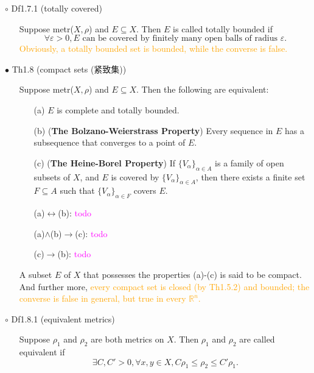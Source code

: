 \documentclass{article}
\begin{document}
{\Large $\circ $ Df1.7.1 (totally covered)}\par
\begin{itemize}
    \item[]
    {\large Suppose metr($X, \rho$) and $E\subseteq X$. Then $E$ is called totally bounded if
    $$\forall\varepsilon>0, E \text{ can be covered by finitely many open balls of radius }\varepsilon. $$}
    {\textcolor{orange}{Obviously, a totally bounded set is bounded, while the converse is false.}}
\end{itemize}\par
\quad

{\Large $\bullet $ Th1.8 (compact sets (紧致集))}\par
\begin{itemize}
    \item[]
    {\large Suppose metr($X, \rho$) and $E\subseteq X$. Then the following are equivalent:
    \begin{enumerate}
        \item[(a)] $E$ is complete and totally bounded.
        \item[(b)] (\textbf{The Bolzano-Weierstrass Property}) Every sequence in $E$ has a subsequence 
        that converges to a point of $E$.
        \item[(c)] (\textbf{The Heine-Borel Property}) If $\{V_\alpha\}_{\alpha \in A}$ is a family of open subsets
        of $X$, and $E$ is covered by $\{V_\alpha\}_{\alpha \in A}$, 
        then there exists a finite set $F\subseteq A$ such
        that $\{V_\alpha\}_{\alpha \in F}$ covers $E$. 
    \end{enumerate}}
    {\textcolor{pf}{
        \begin{enumerate}
            \item[(a)$\leftrightarrow $(b):] \textcolor{magenta}{todo}
            \item[(a)$\land $(b)$\rightarrow $(c):] \textcolor{magenta}{todo}
            \item[(c)$\rightarrow $(b):] \textcolor{magenta}{todo} 
        \end{enumerate}
        A subset $E$ of $X$ that possesses the properties (a)-(c) is said to be compact. And further more, 
        \textcolor{orange}{every compact set is closed (by Th1.5.2) and bounded; 
        the converse is false in general, but true in every $\mathbb{R}^n$.}}}
\end{itemize}\par
\quad

{\Large $\circ $ Df1.8.1 (equivalent metrics)}\par
\begin{itemize}
    \item[]
    {\large Suppose $\rho_1$ and $\rho_2$ are both metrics on $X$. 
    Then $\rho_1$ and $\rho_2$ are called equivalent if
    $$\exists C,C'>0, \forall x,y\in X, C\rho_1\leqslant \rho_2\leqslant C'\rho_1.$$}
    {\textcolor{pf}{}}
\end{itemize}\par
\quad
\end{document}
